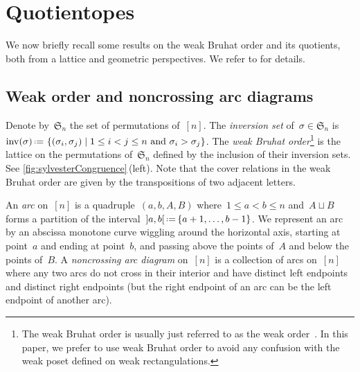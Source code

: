 \documentclass{amsart}
\theoremstyle{definition}
\newcommand{\f}[1]{\mathfrak{#1}} %
\newcommand{\set}[2]{\left\{ #1 \;\middle|\; #2 \right\}} %
\newcommand{\eqdef}{\mbox{\,\raisebox{0.2ex}{\scriptsize\ensuremath{\mathrm:}}\ensuremath{=}\,}} %
\DeclareMathOperator{\inv}{inv} %
\newcommand{\darkblue}{\color{darkblue}} %
\newcommand{\defn}[1]{\textsl{\darkblue #1}} %
\begin{document}

\section{Quotientopes}
\label{sec:quotientopes}

We now briefly recall some results on the weak Bruhat order and its quotients, both from a lattice and geometric perspectives.
We refer to \cite{MR2142177, Reading-arcDiagrams, MR3645056, MR3645055, MR3964495, MR4584712} for details.


\subsection{Weak order and noncrossing arc diagrams}
\label{subsec:noncrossingArcDiagrams}

Denote by~$\f{S}_n$ the set of permutations of~$[n]$.
The \defn{inversion set} of~$\sigma \in \f{S}_n$ is~$\inv(\sigma) \eqdef \set{(\sigma_i, \sigma_j)}{1 \le i < j \le n \text{ and } \sigma_i > \sigma_j}$.
The \defn{weak Bruhat order}\footnote{The weak Bruhat order is usually just referred to as the weak order~\cite{MR1066460, MR2133266}. In this paper, we prefer to use weak Bruhat order to avoid any confusion with the weak poset defined on weak rectangulations.} is the lattice on the permutations of~$\f{S}_n$ defined by the inclusion of their inversion sets.
See \cref{fig:sylvesterCongruence}\,(left).
Note that the cover relations in the weak Bruhat order are given by the transpositions of two adjacent letters.

An \defn{arc} on~$[n]$ is a quadruple~$(a, b, A, B)$ where~$1 \le a < b \le n$ and~$A \sqcup B$ forms a partition of the interval~${]a,b[} \eqdef \{a+1, \dots, b-1\}$.
We represent an arc by an abscissa monotone curve wiggling around the horizontal axis, starting at point~$a$ and ending at point~$b$, and passing above the points of~$A$ and below the points of~$B$.
A \defn{noncrossing arc diagram} on~$[n]$ is a collection of arcs on~$[n]$ where any two arcs do not cross in their interior and have distinct left endpoints and distinct right endpoints (but the right endpoint of an arc can be the left endpoint of another arc).
\end{document}
